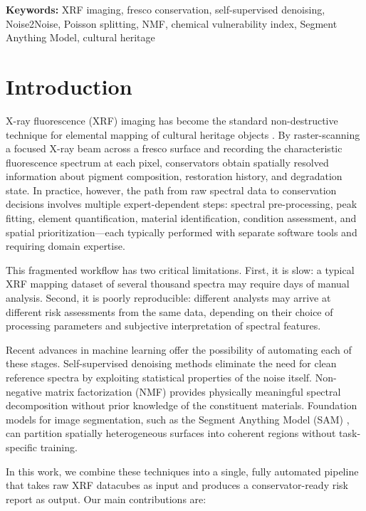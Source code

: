 \documentclass[twocolumn,11pt]{article}
\begin{document}
\smallskip
\noindent\textbf{Keywords:} XRF imaging, fresco conservation, self-supervised
denoising, Noise2Noise, Poisson splitting, NMF, chemical vulnerability index,
Segment Anything Model, cultural heritage

\section{Introduction}
\label{sec:intro}

X-ray fluorescence (XRF) imaging has become the standard non-destructive
technique for elemental mapping of cultural heritage objects
\citep{janssens2000,milazzo2004}. By raster-scanning a focused X-ray beam
across a fresco surface and recording the characteristic fluorescence spectrum
at each pixel, conservators obtain spatially resolved information about
pigment composition, restoration history, and degradation state. In practice,
however, the path from raw spectral data to conservation decisions involves
multiple expert-dependent steps: spectral pre-processing, peak fitting,
element quantification, material identification, condition assessment, and
spatial prioritization---each typically performed with separate software tools
and requiring domain expertise.

This fragmented workflow has two critical limitations. First, it is slow:
a typical XRF mapping dataset of several thousand spectra may require days of
manual analysis. Second, it is poorly reproducible: different analysts may
arrive at different risk assessments from the same data, depending on their
choice of processing parameters and subjective interpretation of spectral
features.

Recent advances in machine learning offer the possibility of automating each
of these stages. Self-supervised denoising methods \citep{lehtinen2018noise2noise,
batson2019noise2self} eliminate the need for clean reference spectra by
exploiting statistical properties of the noise itself. Non-negative matrix
factorization (NMF) \citep{lee1999nmf} provides physically meaningful spectral
decomposition without prior knowledge of the constituent materials.
Foundation models for image segmentation, such as the Segment Anything Model
(SAM) \citep{kirillov2023sam}, can partition spatially heterogeneous surfaces
into coherent regions without task-specific training.

In this work, we combine these techniques into a single, fully automated
pipeline that takes raw XRF datacubes as input and produces a
conservator-ready risk report as output. Our main contributions are:
\end{document}
